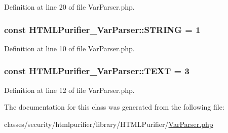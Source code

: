 Definition at line 20 of file Var\+Parser.\+php.

\hypertarget{classHTMLPurifier__VarParser_a44f72ff042eafa191ec51949f33228da}{
\subsubsection[{S\+T\+R\+I\+N\+G}]{\setlength{\rightskip}{0pt plus 5cm}const H\+T\+M\+L\+Purifier\+\_\+\+Var\+Parser\+::\+S\+T\+R\+I\+N\+G = 1}}\label{classHTMLPurifier__VarParser_a44f72ff042eafa191ec51949f33228da}


Definition at line 10 of file Var\+Parser.\+php.

\hypertarget{classHTMLPurifier__VarParser_a779fccb6c9d4d94082669d0798d28474}{
\subsubsection[{T\+E\+X\+T}]{\setlength{\rightskip}{0pt plus 5cm}const H\+T\+M\+L\+Purifier\+\_\+\+Var\+Parser\+::\+T\+E\+X\+T = 3}}\label{classHTMLPurifier__VarParser_a779fccb6c9d4d94082669d0798d28474}


Definition at line 12 of file Var\+Parser.\+php.



The documentation for this class was generated from the following file\+:\begin{DoxyCompactItemize}
\item 
classes/security/htmlpurifier/library/\+H\+T\+M\+L\+Purifier/\hyperlink{VarParser_8php}{Var\+Parser.\+php}\end{DoxyCompactItemize}
